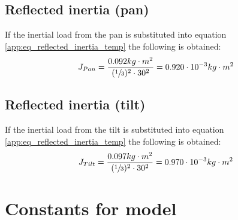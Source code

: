 \subsection{Reflected inertia (pan)}
If the inertial load from the pan is substituted into equation \ref{app:eq_reflected_inertia_temp} the following is obtained:
\begin{equation}
	J_{Pan} = \frac{0.092 kg \cdot m^{2}}{(\sfrac{1}{3})^{2} \cdot 30^{2}} = 0.920 \cdot 10^{-3} kg \cdot m^{2} \label{app:eq_reflected_pan_inertia}
\end{equation}

\subsection{Reflected inertia (tilt)}
If the inertial load from the tilt is substituted into equation \ref{app:eq_reflected_inertia_temp} the following is obtained:
\begin{equation}
	J_{Tilt} = \frac{0.097 kg \cdot m^{2}}{(\sfrac{1}{3})^{2} \cdot 30^{2}} = 0.970 \cdot 10^{-3} kg \cdot m^{2} \label{app:eq_reflected_tilt_inertia}
\end{equation} 

\section{Constants for model}
